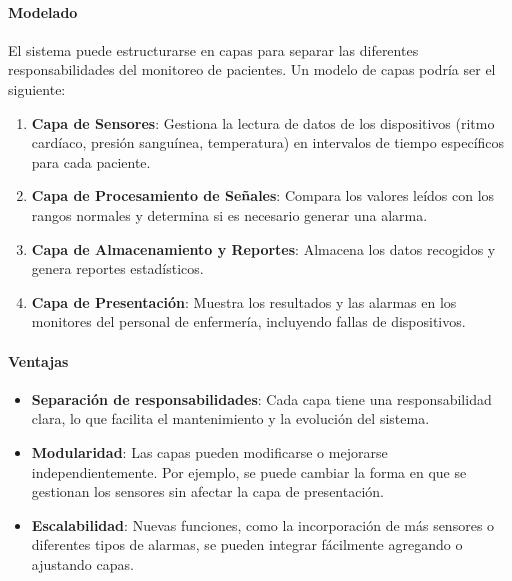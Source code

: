 	\paragraph{Modelado}

	El sistema puede estructurarse en capas para separar las diferentes
	responsabilidades del monitoreo de pacientes. Un modelo de capas podría
	ser el siguiente:

	\begin{enumerate}
		\item \textbf{Capa de Sensores}: Gestiona la lectura de datos de los
			dispositivos (ritmo cardíaco, presión sanguínea, temperatura) en
			intervalos de tiempo específicos para cada paciente.

		\item \textbf{Capa de Procesamiento de Señales}: Compara los valores
			leídos con los rangos normales y determina si es necesario generar
			una alarma.

		\item \textbf{Capa de Almacenamiento y Reportes}: Almacena los datos
			recogidos y genera reportes estadísticos.

		\item \textbf{Capa de Presentación}: Muestra los resultados y las
			alarmas en los monitores del personal de enfermería, incluyendo
			fallas de dispositivos.
	\end{enumerate}

	\paragraph{Ventajas}

	\begin{itemize}
		\item \textbf{Separación de responsabilidades}: Cada capa tiene una
			responsabilidad clara, lo que facilita el mantenimiento y la
			evolución del sistema.

		\item \textbf{Modularidad}: Las capas pueden modificarse o mejorarse
			independientemente. Por ejemplo, se puede cambiar la forma en que
			se gestionan los sensores sin afectar la capa de presentación.

		\item \textbf{Escalabilidad}: Nuevas funciones, como la
			incorporación de más sensores o diferentes tipos de alarmas, se
			pueden integrar fácilmente agregando o ajustando capas.
	\end{itemize}

